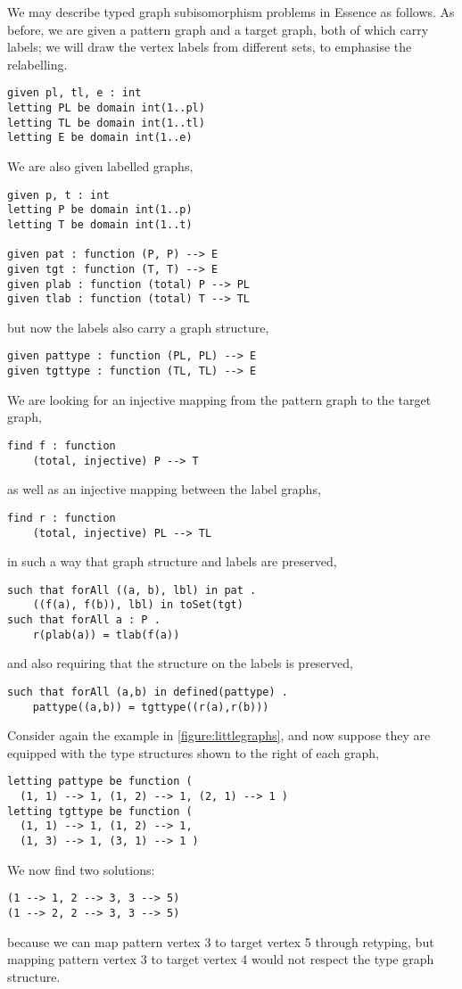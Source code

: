 \documentclass[runningheads]{llncs}
\begin{document}
We may describe typed graph subisomorphism problems in Essence as follows. As before, we are given a
pattern graph and a target graph, both of which carry labels; we will draw the vertex labels from
different sets, to emphasise
the relabelling.
\begin{lstlisting}
given pl, tl, e : int
letting PL be domain int(1..pl)
letting TL be domain int(1..tl)
letting E be domain int(1..e)
\end{lstlisting}
We are also given labelled graphs,
\begin{lstlisting}
given p, t : int
letting P be domain int(1..p)
letting T be domain int(1..t)

given pat : function (P, P) --> E
given tgt : function (T, T) --> E
given plab : function (total) P --> PL
given tlab : function (total) T --> TL
\end{lstlisting}
but now the labels also carry a graph structure,
\begin{lstlisting}
given pattype : function (PL, PL) --> E
given tgttype : function (TL, TL) --> E
\end{lstlisting}
We are looking for an injective mapping from the pattern graph to the target graph,
\begin{lstlisting}
find f : function
    (total, injective) P --> T
\end{lstlisting}
as well as an injective mapping between the label graphs,
\begin{lstlisting}
find r : function
    (total, injective) PL --> TL
\end{lstlisting}
in such a way that graph structure and labels are preserved,
\begin{lstlisting}
such that forAll ((a, b), lbl) in pat .
    ((f(a), f(b)), lbl) in toSet(tgt)
such that forAll a : P .
    r(plab(a)) = tlab(f(a))
\end{lstlisting}
and also requiring that the structure on the labels is preserved,
\begin{lstlisting}
such that forAll (a,b) in defined(pattype) .
    pattype((a,b)) = tgttype((r(a),r(b)))
\end{lstlisting}

Consider again the example in \cref{figure:littlegraphs}, and now suppose they are equipped with the type
structures shown to the right of each graph,
\begin{lstlisting}
letting pattype be function (
  (1, 1) --> 1, (1, 2) --> 1, (2, 1) --> 1 )
letting tgttype be function (
  (1, 1) --> 1, (1, 2) --> 1,
  (1, 3) --> 1, (3, 1) --> 1 )
\end{lstlisting}
We now find two solutions:
\begin{lstlisting}
(1 --> 1, 2 --> 3, 3 --> 5)
(1 --> 2, 2 --> 3, 3 --> 5)
\end{lstlisting}
because we can map pattern vertex 3 to target vertex 5 through retyping, but mapping pattern vertex 3
to target vertex 4 would not respect the type graph structure.
\end{document}
